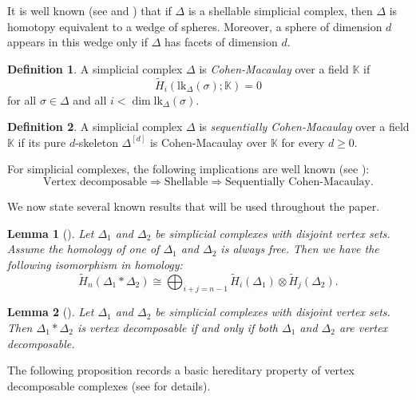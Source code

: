 \documentclass[12pt,reqno]{amsart}
\newtheorem{lemma}[lemma]{Lemma}
\theoremstyle{definition}
\newtheorem{definition}[definition]{Definition}
\newcommand{\lk}{{\mathrm{lk}}}
\begin{document}
It is well known (see \cite[Theorem 3.35]{JJ08} and \cite[Theorem 12.3]{kozlov2007}) that if $\Delta$ is a shellable simplicial complex, then $\Delta$ is homotopy equivalent to a wedge of spheres. Moreover, a sphere of dimension $d$ appears in this wedge only if $\Delta$ has facets of dimension $d$.

\begin{definition}\label{def:CM}
A simplicial complex $\Delta$ is \emph{Cohen-Macaulay} over a field $\mathbb{K}$ if
\[
\widetilde{H}_i(\lk_{\Delta}(\sigma);\mathbb{K}) = 0
\]
for all $\sigma \in \Delta$ and all $i < \dim \lk_{\Delta}(\sigma)$.
\end{definition}

\begin{definition}\label{def:SCM}
A simplicial complex $\Delta$ is \emph{sequentially Cohen-Macaulay} over a field $\mathbb{K}$ if its pure $d$-skeleton $\Delta^{[d]}$ is Cohen-Macaulay over $\mathbb{K}$ for every $d\ge0$.
\end{definition}

For simplicial complexes, the following implications are well known (see \cite[Theorem 3.33]{JJ08}):
\begin{equation}\label{eq: implications}
\text{Vertex decomposable}
\Rightarrow
\text{Shellable}
\Rightarrow
\text{Sequentially Cohen-Macaulay}.
\end{equation}

We now state several known results that will be used throughout the paper.

\begin{lemma}[{\cite[Equation 9.12]{TMAB}}]\label{lem: homology for join operation}
    Let $\Delta_1$ and $\Delta_2$ be simplicial complexes with disjoint vertex sets. Assume the homology of one of $\Delta_1$ and $\Delta_2$ is always free. Then we have the following isomorphism in homology:
    \[
\widetilde H_n(\Delta_1 * \Delta_2)
\cong
\bigoplus_{i+j=n-1}
\widetilde H_i(\Delta_1)
\otimes
\widetilde H_j(\Delta_2).
\]
\end{lemma}

\begin{lemma}[{\cite[Theorem 3.30]{JJ08}}]\label{join property}
Let $\Delta_1$ and $\Delta_2$ be simplicial complexes with disjoint vertex sets. Then $\Delta_1 * \Delta_2$ is vertex decomposable if and only if both $\Delta_1$ and $\Delta_2$ are vertex decomposable.
\end{lemma}

The following proposition records a basic hereditary property of vertex decomposable complexes (see \cite{JJ08} for details).
\end{document}
